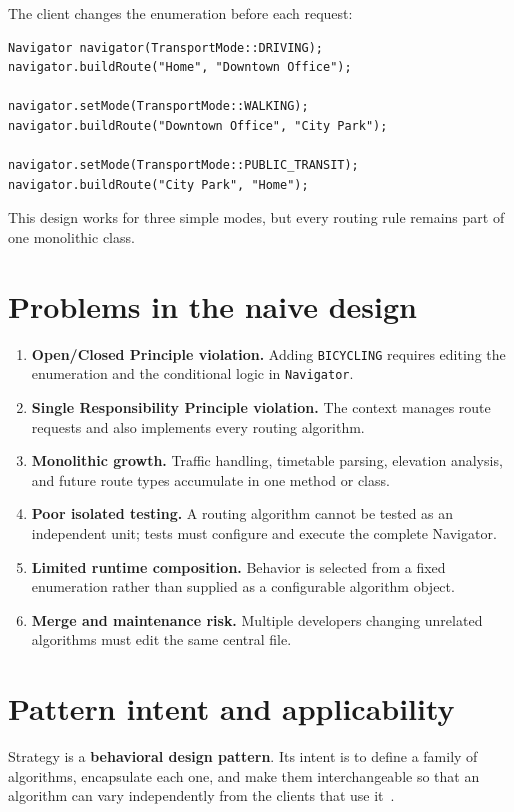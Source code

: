 \documentclass[11pt,a4paper]{report}
\begin{document}
The client changes the enumeration before each request:

\begin{lstlisting}[style=cpp]
Navigator navigator(TransportMode::DRIVING);
navigator.buildRoute("Home", "Downtown Office");

navigator.setMode(TransportMode::WALKING);
navigator.buildRoute("Downtown Office", "City Park");

navigator.setMode(TransportMode::PUBLIC_TRANSIT);
navigator.buildRoute("City Park", "Home");
\end{lstlisting}

This design works for three simple modes, but every routing rule remains part of
one monolithic class.

\section{Problems in the naive design}
\begin{enumerate}
  \item \textbf{Open/Closed Principle violation.} Adding
  \texttt{BICYCLING} requires editing the enumeration and the conditional logic
  in \texttt{Navigator}.
  \item \textbf{Single Responsibility Principle violation.} The context manages
  route requests and also implements every routing algorithm.
  \item \textbf{Monolithic growth.} Traffic handling, timetable parsing,
  elevation analysis, and future route types accumulate in one method or class.
  \item \textbf{Poor isolated testing.} A routing algorithm cannot be tested as
  an independent unit; tests must configure and execute the complete Navigator.
  \item \textbf{Limited runtime composition.} Behavior is selected from a fixed
  enumeration rather than supplied as a configurable algorithm object.
  \item \textbf{Merge and maintenance risk.} Multiple developers changing
  unrelated algorithms must edit the same central file.
\end{enumerate}

\section{Pattern intent and applicability}
Strategy is a \textbf{behavioral design pattern}. Its intent is to define a
family of algorithms, encapsulate each one, and make them interchangeable so
that an algorithm can vary independently from the clients that use it~\cite{gof}.
\end{document}

